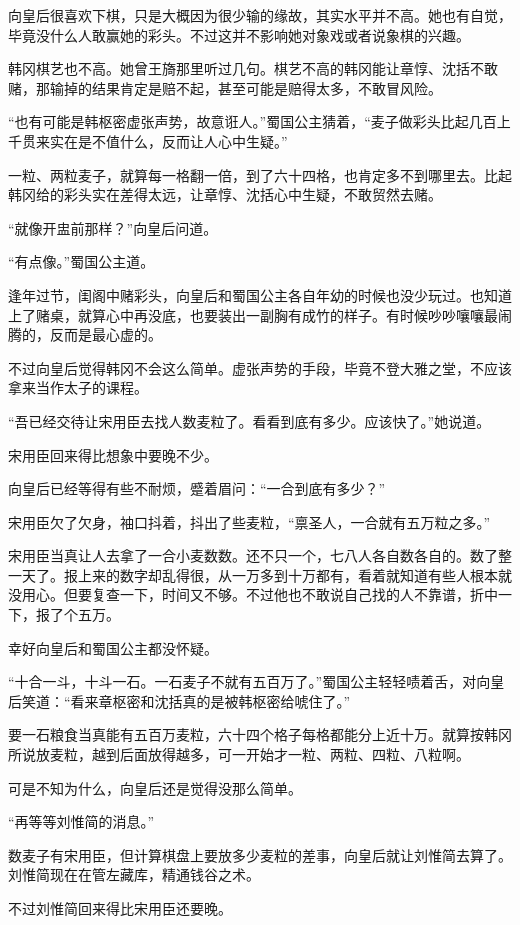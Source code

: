 向皇后很喜欢下棋，只是大概因为很少输的缘故，其实水平并不高。她也有自觉，毕竟没什么人敢赢她的彩头。不过这并不影响她对象戏或者说象棋的兴趣。

韩冈棋艺也不高。她曾王旖那里听过几句。棋艺不高的韩冈能让章惇、沈括不敢赌，那输掉的结果肯定是赔不起，甚至可能是赔得太多，不敢冒风险。

“也有可能是韩枢密虚张声势，故意诳人。”蜀国公主猜着，“麦子做彩头比起几百上千贯来实在是不值什么，反而让人心中生疑。”

一粒、两粒麦子，就算每一格翻一倍，到了六十四格，也肯定多不到哪里去。比起韩冈给的彩头实在差得太远，让章惇、沈括心中生疑，不敢贸然去赌。

“就像开盅前那样？”向皇后问道。

“有点像。”蜀国公主道。

逢年过节，闺阁中赌彩头，向皇后和蜀国公主各自年幼的时候也没少玩过。也知道上了赌桌，就算心中再没底，也要装出一副胸有成竹的样子。有时候吵吵嚷嚷最闹腾的，反而是最心虚的。

不过向皇后觉得韩冈不会这么简单。虚张声势的手段，毕竟不登大雅之堂，不应该拿来当作太子的课程。

“吾已经交待让宋用臣去找人数麦粒了。看看到底有多少。应该快了。”她说道。

宋用臣回来得比想象中要晚不少。

向皇后已经等得有些不耐烦，蹙着眉问：“一合到底有多少？”

宋用臣欠了欠身，袖口抖着，抖出了些麦粒，“禀圣人，一合就有五万粒之多。”

宋用臣当真让人去拿了一合小麦数数。还不只一个，七八人各自数各自的。数了整一天了。报上来的数字却乱得很，从一万多到十万都有，看着就知道有些人根本就没用心。但要复查一下，时间又不够。不过他也不敢说自己找的人不靠谱，折中一下，报了个五万。

幸好向皇后和蜀国公主都没怀疑。

“十合一斗，十斗一石。一石麦子不就有五百万了。”蜀国公主轻轻啧着舌，对向皇后笑道：“看来章枢密和沈括真的是被韩枢密给唬住了。”

要一石粮食当真能有五百万麦粒，六十四个格子每格都能分上近十万。就算按韩冈所说放麦粒，越到后面放得越多，可一开始才一粒、两粒、四粒、八粒啊。

可是不知为什么，向皇后还是觉得没那么简单。

“再等等刘惟简的消息。”

数麦子有宋用臣，但计算棋盘上要放多少麦粒的差事，向皇后就让刘惟简去算了。刘惟简现在在管左藏库，精通钱谷之术。

不过刘惟简回来得比宋用臣还要晚。

